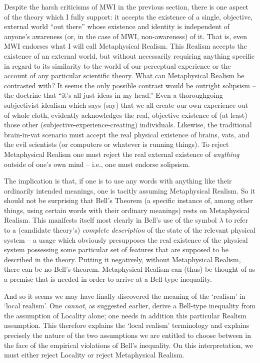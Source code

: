 \documentclass[12pt]{article}
\begin{document}
Despite the harsh criticisms of MWI in the previous section, there is
one aspect of the theory which I fully support:  it accepts the
existence of a single, objective, external world ``out there'' 
whose existence and
identity is independent of anyone's awareness (or, in the case of MWI,
non-awareness) of it.  
That is, even MWI endorses what I will call Metaphysical
Realism.  This Realism accepts the existence of an external world, but
without necessarily requiring anything specific in regard to its
similarity to the world of our perceptual experience or the account of
any particular scientific theory.  
What can Metaphysical Realism be contrasted
with?  It seems the only possible contrast would be outright
solipsism -- the doctrine that ``it's all just ideas in my head.''
Even a thoroughgoing subjectivist idealism which says (say) that we
all create our own experience out of whole cloth, evidently acknowledges the
real, objective existence of (at least) those other 
(subjective-experience-creating)
individuals.  Likewise, the traditional brain-in-vat scenario must
accept the real physical existence of brains, vats, and the evil scientists (or
computers or whatever is running things).  To reject Metaphysical
Realism one must reject the real external existence of \emph{anything}
outside of one's own mind -- i.e., one must endorse solipsism.  

The implication is that, if one is to use any words with anything like
their ordinarily intended meanings, one is tacitly assuming
Metaphysical Realism.  So it should not be surprising that Bell's
Theorem (a specific instance of, among other things, using certain
words with their ordinary meanings) rests on Metaphysical Realism.
This manifests itself most clearly in Bell's use of the symbol
$\lambda$ to refer to a (candidate theory's) \emph{complete
  description} of the state of the relevant physical system -- a usage
which obviously presupposes the real existence of the physical system
possessing some particular set of features that are supposed to be
described in the theory.
Putting it negatively, without Metaphysical Realism, there can be no
Bell's theorem.  Metaphysical Realism can (thus) be thought of as a
premise that is needed in order to arrive at a Bell-type inequality.

And so it seems we may have finally discovered the meaning of the
`realism' in `local realism'.  One \emph{cannot}, as suggested
earlier, derive a Bell-type inequality from the assumption of Locality
alone; one needs in addition this particular Realism assumption.  This
therefore explains the `local realism' terminology and explains
precisely the nature of the two assumptions we are entitled to choose 
between in the face of the empirical violations of Bell's inequality.
On this interpretation, we must either reject Locality or reject
Metaphysical Realism.  
\end{document}
